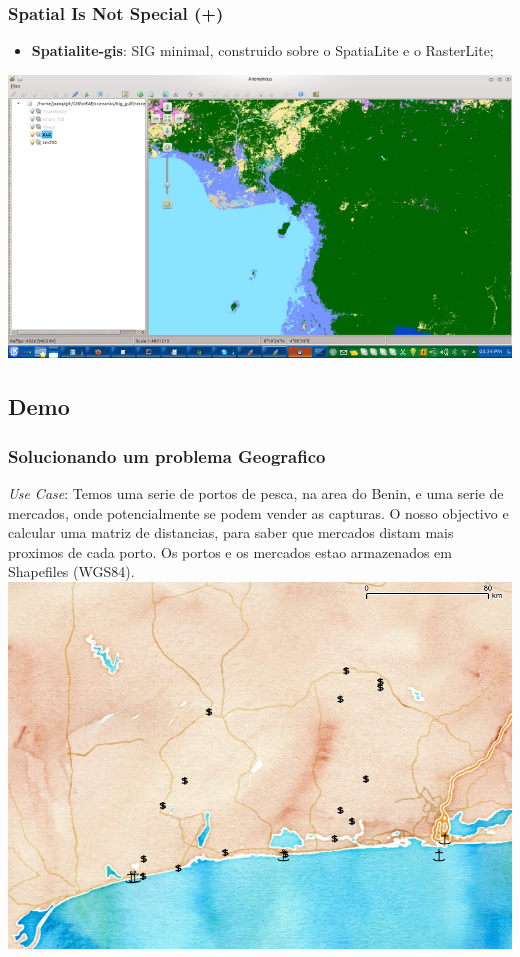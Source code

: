 \documentclass[hyperref={pdfpagelabels=true}]{beamer}
\begin{document}
\begin{frame}
\frametitle{Spatial Is Not Special (+)}
    \begin{itemize}
      \item<1-> \textbf{Spatialite-gis}: SIG minimal, construido sobre o SpatiaLite e o RasterLite;
    \end{itemize}
  \includegraphics[scale=0.4]{spatialite_gis.png}        
\end{frame}

\subsection{Demo}
\begin{frame}
\frametitle{Solucionando um problema Geografico}
\small{
\textit{Use Case}: Temos uma serie de portos de pesca, na area do Benin, e uma serie de mercados, onde potencialmente se podem vender as capturas.
O nosso objectivo e calcular uma matriz de distancias, para saber que mercados distam mais proximos de cada porto. Os portos e os mercados estao armazenados em Shapefiles (WGS84).
}
\includegraphics[scale=0.2]{distances1.png}
\end{frame}
\end{document}
